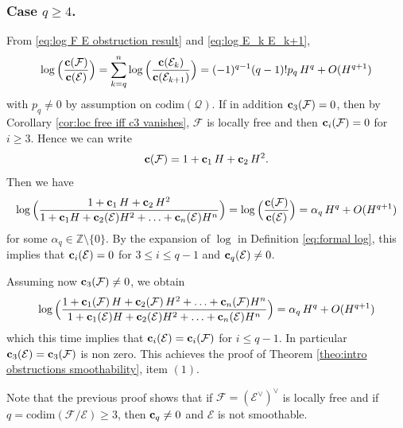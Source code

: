 \documentclass[a4paper,10pt]{amsart}
\theoremstyle{plain}{
    \newtheorem{theorem}{Theorem}[section]
    \newtheorem{lemma}[theorem]{Lemma}
    \newtheorem{corollary}[theorem]{Corollary}
    \newtheorem{proposition}[theorem]{Proposition}
    \newtheorem{conjecture}[theorem]{Conjecture}
}
\theoremstyle{definition}{
    \newtheorem{definition}[theorem]{Definition}
    \newtheorem{defn-thm}[theorem]{Definition-Theorem}
    \newtheorem{example}[theorem]{Example}
    \newtheorem{notation}[theorem]{Notation}
}
\theoremstyle{remark}{
    \newtheorem{remark}[theorem]{Remark}
    \newtheorem{problem}[theorem]{Problem}
    \newtheorem{question}[theorem]{Question}
}
\def\uc{{\bf c}}
\def\cF{\mathcal{F}}
\def\cE{\mathcal{E}}
\def\cQ{\mathcal{Q}}
\def\Z{\mathbb{Z}}
\def\codim{\mathrm{codim}}
\begin{document}
\subsubsection{Case $q\geq 4$.} From \eqref{eq:log F E obstruction result} and \eqref{eq:log E_k E_k+1},
$$
\log\Big(\frac{\uc(\cF)}{\uc(\cE)} \Big)=\sum_{k=q}^n\log\Big(\frac{\uc(\cE_{k})}{\uc(\cE_{k+1})} \Big)=(-1)^{q-1}(q-1)!p_q\, H^q+O(H^{q+1})
$$
with $p_q\neq 0$ by assumption on $\codim(\cQ)$. If in addition $\uc_3(\cF)=0$, then by Corollary \ref{cor:loc free iff c3 vanishes}, $\cF$ is locally free and then $\uc_i(\cF)=0$ for $i\geq 3$. Hence we can write 
$$\uc(\cF)=1+\uc_1 \,H+\uc_2\, H^2.$$
Then we have
$$
\displaystyle\log\Big(\frac{1+\uc_1 \,H+\uc_2\, H^2}{1+\uc_1 H+\uc_2(\cE) H^2+\ldots +\uc_n(\cE) H^n}\Big)=\log\Big(\frac{\uc(\cF)}{\uc(\cE)} \Big)  =\alpha_q \, H^q+O(H^{q+1})
$$
for some $\alpha_q\in\Z\setminus\lbrace 0\rbrace$.
By the expansion of $\log$ in Definition \ref{eq:formal log}, this implies that $\uc_i(\cE)=0$ for $3\leq i \leq q-1$ and $\uc_q(\cE)\neq 0$.

Assuming now $\uc_3(\cF)\neq 0$, we obtain
\begin{eqnarray*}
\displaystyle\log\Big(\frac{1+\uc_1(\cF) \,H+\uc_2(\cF)\, H^2+\ldots+\uc_n(\cF)H^n}{1+\uc_1(\cE) H+\uc_2(\cE) H^2+\ldots +\uc_n(\cE) H^n}\Big)=\alpha_q \, H^q+O(H^{q+1})
\end{eqnarray*}
which this time implies that $\uc_i(\cE)=\uc_i(\cF)$ for $i\leq q-1$. In particular $\uc_3(\cE)=\uc_3(\cF)$ is non zero. This achieves the proof of Theorem \ref{theo:intro obstructions smoothability}, item $(1)$.

\begin{remark}
 Note that the previous proof shows that if $\cF=(\cE^\vee)^\vee$ is locally free and if $q=\codim(\cF/\cE)\geq 3$, then $\uc_q\neq 0$ and $\cE$ is not smoothable.
\end{remark}
\end{document}
